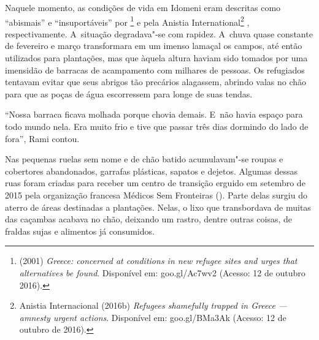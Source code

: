 Naquele momento, as condições de vida em Idomeni eram descritas como
``abismais'' e ``insuportáveis'' por \footnote{  (2001) \emph{Greece:  concerned at
conditions in new refugee sites and urges that alternatives be found}.
Disponível em:
goo.gl/Ac7wv2
(Acesso: 12 de outubro 2016).}  e
pela  Anistia International\footnote{ Anistia Internacional (2016b) \emph{Refugees
shamefully trapped in Greece --- amnesty urgent actions}. Disponível em:
goo.gl/BMa3Ak
(Acesso: 12 de outubro de 2016).} ,
respectivamente. A~situação degradava"-se com rapidez. A~chuva quase
constante de fevereiro e março transformara em um imenso lamaçal os
campos, até então utilizados para plantações, mas que àquela altura
haviam sido tomados por uma imensidão de barracas de acampamento com
milhares de pessoas. Os refugiados tentavam evitar que seus abrigos tão precários
alagassem, abrindo valas no chão para que as poças de água escorressem para longe de suas tendas.

``Nossa barraca ficava molhada porque chovia demais. E~não havia espaço
para todo mundo nela. Era muito frio e tive que passar
três dias dormindo do lado de fora'', Rami contou.

Nas pequenas ruelas sem nome e de chão batido acumulavam"-se roupas e
cobertores abandonados, garrafas plásticas, sapatos e dejetos. Algumas
dessas ruas foram criadas para receber um centro de transição erguido em
setembro de 2015 pela organização francesa Médicos Sem Fronteiras ().
Parte delas surgiu do aterro de áreas destinadas a plantações. Nelas, o
lixo que transbordava de muitas das caçambas acabava no chão, deixando
um rastro, dentre outras coisas, de fraldas sujas e alimentos já consumidos.

